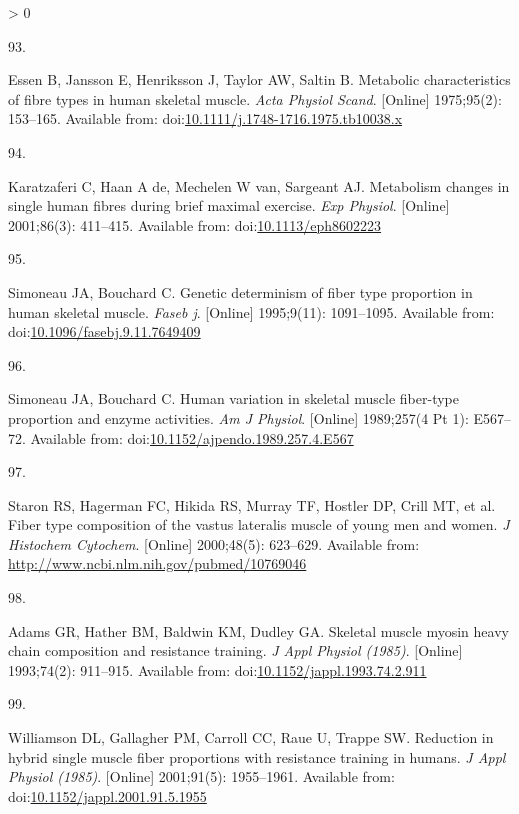 \documentclass[twoside,10pt]{gihclass} %
\newlength{\cslhangindent}
\newlength{\csllabelwidth}
\newenvironment{CSLReferences}[3] %
 {%
  \setlength{\parindent}{0pt}
  \ifodd #1 \everypar{\setlength{\hangindent}{\cslhangindent}}\ignorespaces\fi
  \ifnum #2 > 0
  \setlength{\parskip}{#2\baselineskip}
  \fi
 }%
 {}
\newcommand{\CSLLeftMargin}[1]{\parbox[t]{\maxof{\widthof{#1}}{\csllabelwidth}}{#1}}
\newcommand{\CSLRightInline}[1]{\parbox[t]{\linewidth}{#1}}
\begin{document}
\begin{CSLReferences}{0}{0}
\leavevmode\hypertarget{ref-RN1885}{}%
\CSLLeftMargin{93. }
\CSLRightInline{Essen B, Jansson E, Henriksson J, Taylor AW, Saltin B. Metabolic characteristics of fibre types in human skeletal muscle. \emph{Acta Physiol Scand}. {[}Online{]} 1975;95(2): 153--165. Available from: doi:\href{https://doi.org/10.1111/j.1748-1716.1975.tb10038.x}{10.1111/j.1748-1716.1975.tb10038.x}}

\leavevmode\hypertarget{ref-RN2801}{}%
\CSLLeftMargin{94. }
\CSLRightInline{Karatzaferi C, Haan A de, Mechelen W van, Sargeant AJ. Metabolism changes in single human fibres during brief maximal exercise. \emph{Exp Physiol}. {[}Online{]} 2001;86(3): 411--415. Available from: doi:\href{https://doi.org/10.1113/eph8602223}{10.1113/eph8602223}}

\leavevmode\hypertarget{ref-RN2798}{}%
\CSLLeftMargin{95. }
\CSLRightInline{Simoneau JA, Bouchard C. Genetic determinism of fiber type proportion in human skeletal muscle. \emph{Faseb j}. {[}Online{]} 1995;9(11): 1091--1095. Available from: doi:\href{https://doi.org/10.1096/fasebj.9.11.7649409}{10.1096/fasebj.9.11.7649409}}

\leavevmode\hypertarget{ref-RN2795}{}%
\CSLLeftMargin{96. }
\CSLRightInline{Simoneau JA, Bouchard C. Human variation in skeletal muscle fiber-type proportion and enzyme activities. \emph{Am J Physiol}. {[}Online{]} 1989;257(4 Pt 1): E567--72. Available from: doi:\href{https://doi.org/10.1152/ajpendo.1989.257.4.E567}{10.1152/ajpendo.1989.257.4.E567}}

\leavevmode\hypertarget{ref-RN285}{}%
\CSLLeftMargin{97. }
\CSLRightInline{Staron RS, Hagerman FC, Hikida RS, Murray TF, Hostler DP, Crill MT, et al. Fiber type composition of the vastus lateralis muscle of young men and women. \emph{J Histochem Cytochem}. {[}Online{]} 2000;48(5): 623--629. Available from: \url{http://www.ncbi.nlm.nih.gov/pubmed/10769046}}

\leavevmode\hypertarget{ref-RN2220}{}%
\CSLLeftMargin{98. }
\CSLRightInline{Adams GR, Hather BM, Baldwin KM, Dudley GA. Skeletal muscle myosin heavy chain composition and resistance training. \emph{J Appl Physiol (1985)}. {[}Online{]} 1993;74(2): 911--915. Available from: doi:\href{https://doi.org/10.1152/jappl.1993.74.2.911}{10.1152/jappl.1993.74.2.911}}

\leavevmode\hypertarget{ref-RN2799}{}%
\CSLLeftMargin{99. }
\CSLRightInline{Williamson DL, Gallagher PM, Carroll CC, Raue U, Trappe SW. Reduction in hybrid single muscle fiber proportions with resistance training in humans. \emph{J Appl Physiol (1985)}. {[}Online{]} 2001;91(5): 1955--1961. Available from: doi:\href{https://doi.org/10.1152/jappl.2001.91.5.1955}{10.1152/jappl.2001.91.5.1955}}


\end{CSLReferences}
\end{document}
